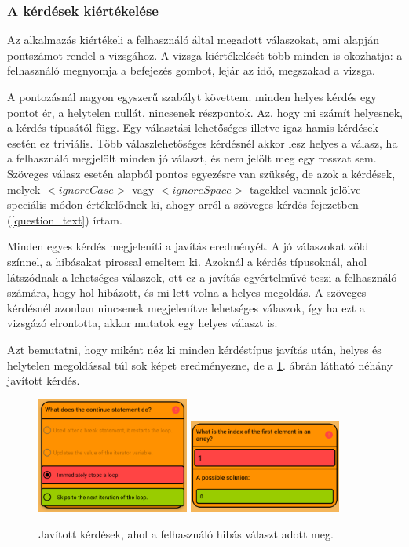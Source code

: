 \documentclass[12pt,a4paper]{article}
\begin{document}
	\subsubsection{A kérdések kiértékelése}
	
	Az alkalmazás kiértékeli a felhasználó által megadott válaszokat, ami alapján pontszámot rendel a vizsgához. A vizsga kiértékelését több minden is okozhatja: a felhasználó megnyomja a befejezés gombot, lejár az idő, megszakad a vizsga.
	
	A pontozásnál nagyon egyszerű szabályt követtem: minden helyes kérdés egy pontot ér, a helytelen nullát, nincsenek részpontok. Az, hogy mi számít helyesnek, a kérdés típusától függ. Egy választási lehetőséges illetve igaz-hamis kérdések esetén ez triviális. Több válaszlehetőséges kérdésnél akkor lesz helyes a válasz, ha a felhasználó megjelölt minden jó választ, és nem jelölt meg egy rosszat sem. Szöveges válasz esetén alapból pontos egyezésre van szükség, de azok a kérdések, melyek $<ignoreCase>$ vagy $<ignoreSpace>$ tagekkel vannak jelölve speciális módon értékelődnek ki, ahogy arról a szöveges kérdés fejezetben (\ref{question_text}) írtam.
	
	Minden egyes kérdés megjeleníti a javítás eredményét. A jó válaszokat zöld színnel, a hibásakat pirossal emeltem ki. Azoknál a kérdés típusoknál, ahol látszódnak a lehetséges válaszok, ott ez a javítás egyértelművé teszi a felhasználó számára, hogy hol hibázott, és mi lett volna a helyes megoldás. A szöveges kérdésnél azonban nincsenek megjelenítve lehetséges válaszok, így ha ezt a vizsgázó elrontotta, akkor mutatok egy helyes választ is.
	
	Azt bemutatni, hogy miként néz ki minden kérdéstípus javítás után, helyes és helytelen megoldással túl sok képet eredményezne, de a \ref{corrected_questions}. ábrán látható néhány javított kérdés.
	
	\begin{figure}[h!]
		\centering
		\includegraphics[width=5cm]{corrected_question_1}
		\includegraphics[width=5cm]{corrected_question_2}
		\caption{Javított kérdések, ahol a felhasználó hibás választ adott meg.}
		\label{corrected_questions}
	\end{figure}
	
\end{document}
